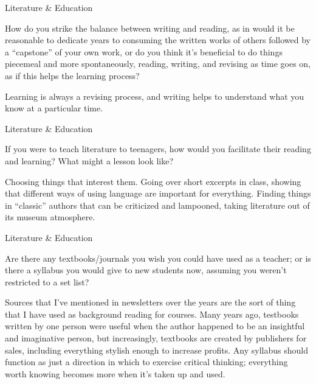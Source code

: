 \documentclass[11pt,oneside,openany,extrafontsizes]{memoir}
\begin{document}
\begin{qaexchange}{Literature \& Education}

    \begin{question}
         How do you strike the balance between writing and reading, as in would it be reasonable to dedicate years to consuming the written works of others followed by a \enquote{capstone} of your own work, or do you think it's beneficial to do things piecemeal and more spontaneously, reading, writing, and revising as time goes on, as if this helps the learning process?
    \end{question}

    \begin{answer}
      Learning is always a revising process, and writing helps to understand what you know at a particular time.
    \end{answer}
\end{qaexchange}

\begin{qaexchange}{Literature \& Education}

    \begin{question}
        If you were to teach literature to teenagers, how would you facilitate their reading and learning? What might a lesson look like?
    \end{question}

    \begin{answer}
      Choosing things that interest them. Going over short excerpts in class, showing that different ways of using language are important for everything. Finding things in \enquote{classic} authors that can be criticized and lampooned, taking literature out of its museum atmosphere.
    \end{answer}
\end{qaexchange}

\begin{qaexchange}{Literature \& Education}

    \begin{question}
        Are there any textbooks/journals you wish you could have used as a teacher; or is there a syllabus you would give to new students now, assuming you weren't restricted to a set list?
    \end{question}

    \begin{answer}
      Sources that I've mentioned in newsletters over the years are the sort of thing that I have used as background reading for courses. Many years ago, testbooks written by one person were useful when the author happened to be an insightful and imaginative person, but increasingly, textbooks are created by publishers for sales, including everything stylish enough to increase profits. Any syllabus should function as just a direction in which to exercise critical thinking; everything worth knowing becomes more when it's taken up and used.
    \end{answer}
\end{qaexchange}
\end{document}
